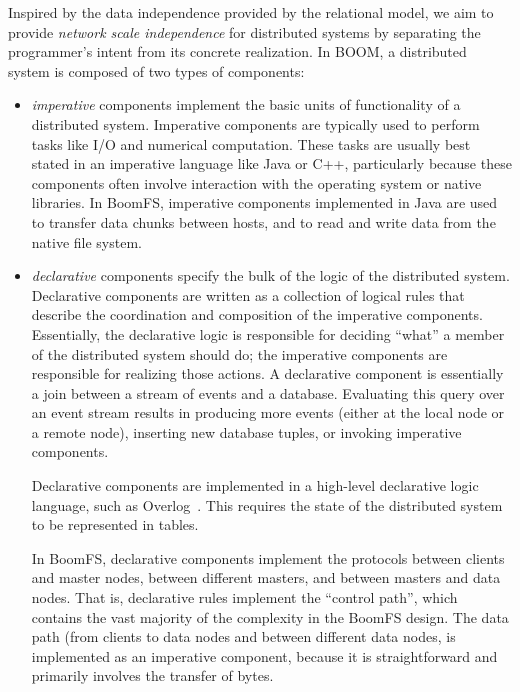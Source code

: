 \documentclass{article}
\begin{document}
Inspired by the data independence provided by the relational model, we
aim to provide \emph{network scale independence} for distributed
systems by separating the programmer's intent from its concrete
realization. In BOOM, a distributed system is composed of two types of
components:
\begin{itemize}
\item
  \emph{imperative} components implement the basic units of
  functionality of a distributed system. Imperative components are
  typically used to perform tasks like I/O and numerical
  computation. These tasks are usually best stated in an imperative
  language like Java or C++, particularly because these components
  often involve interaction with the operating system or native
  libraries. In BoomFS, imperative components implemented in Java are
  used to transfer data chunks between hosts, and to read and write
  data from the native file system.

\item
  \emph{declarative} components specify the bulk of the logic of the
  distributed system. Declarative components are written as a
  collection of logical rules that describe the coordination and
  composition of the imperative components. Essentially, the
  declarative logic is responsible for deciding ``what'' a member of
  the distributed system should do; the imperative components are
  responsible for realizing those actions. A declarative component is
  essentially a join between a stream of events and a
  database. Evaluating this query over an event stream results in
  producing more events (either at the local node or a remote node),
  inserting new database tuples, or invoking imperative
  components.

  Declarative components are implemented in a high-level declarative
  logic language, such as Overlog~\cite{dn-sigmod}. This requires the
  state of the distributed system to be represented in tables.

  In BoomFS, declarative components implement the protocols between
  clients and master nodes, between different masters, and between
  masters and data nodes. That is, declarative rules implement the
  ``control path'', which contains the vast majority of the complexity
  in the BoomFS design. The data path (from clients to data nodes and
  between different data nodes, is implemented as an imperative
  component, because it is straightforward and primarily involves the
  transfer of bytes.
\end{itemize}
\end{document}
